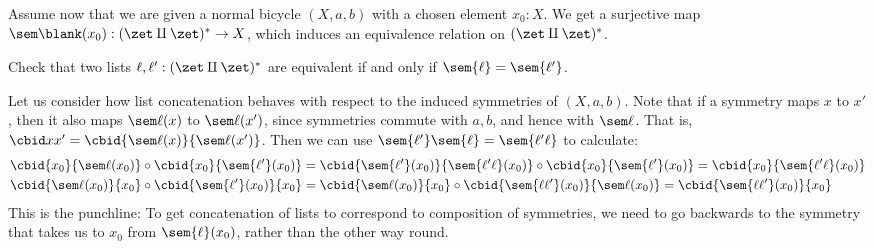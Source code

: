 Assume now that we are given a normal bicycle $(X,a,b)$
with a chosen element $x_0:X$.
We get a surjective map $\sem\blank(x_0) : (\zet\amalg\zet)^* \to X$,
which induces an equivalence relation on $(\zet\amalg\zet)^*$.
\begin{xca}
  Check that two lists $\ell,\ell' : (\zet\amalg\zet)^*$
  are equivalent if and only if
  $\sem{\ell} = \sem{\ell'}$.
\end{xca}

\begin{remark}\label{rem:bicycle-list-concat}
Let us consider how list concatenation behaves with respect
to the induced symmetries of $(X,a,b)$.
Note that if a symmetry maps $x$ to $x'$,
then it also maps $\sem\ell(x)$ to $\sem\ell(x')$,
since symmetries commute with $a,b$, and hence with $\sem\ell$.
That is, $\cbid x{x'} = \cbid{\sem\ell(x)}{\sem\ell(x')}$.
Then we can use $\sem{\ell'}\sem{\ell} = \sem{\ell'\ell}$ to calculate:
\begin{align*}
  \cbid{x_0}{\sem\ell(x_0)} \circ \cbid{x_0}{\sem{\ell'}(x_0)}
  &= \cbid{\sem{\ell'}(x_0)}{\sem{\ell'\ell}(x_0)} \circ \cbid{x_0}{\sem{\ell'}(x_0)}
  = \cbid{x_0}{\sem{\ell'\ell}(x_0)} \\
  \cbid{\sem\ell(x_0)}{x_0} \circ \cbid{\sem{\ell'}(x_0)}{x_0}
  &= \cbid{\sem\ell(x_0)}{x_0} \circ \cbid{\sem{\ell\ell'}(x_0)}{\sem\ell(x_0)}
  = \cbid{\sem{\ell\ell'}(x_0)}{x_0}
\end{align*}
This is the punchline: To get concatenation of lists
to correspond to composition of symmetries, we need
to go backwards to the symmetry that takes us to $x_0$
from $\sem{\ell}(x_0)$, rather than the other way round.
\end{remark}

\begin{marginfigure}
  \caption{A frieze pattern with infinite dihedral symmetry.}
  \label{fig:first-frieze}
\end{marginfigure}

